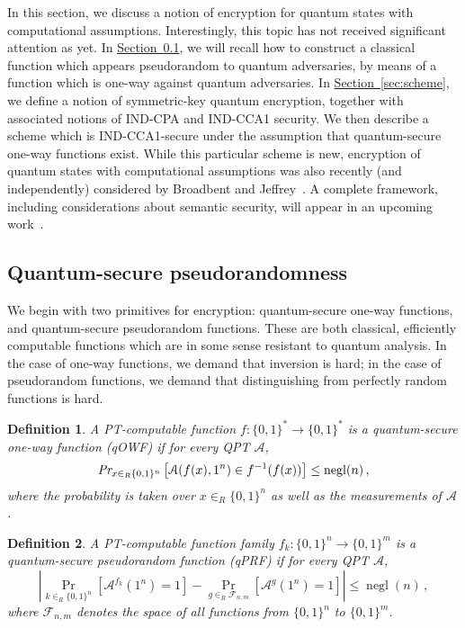 \documentclass[11pt]{article}
\numberwithin{equation}{section}
\newtheorem{definition}{Definition}
\newcommand{\opn}{\operatorname}
\newcommand{\expref}[2]{\texorpdfstring{\hyperref[#2]{#1~\ref{#2}}}{#1~\ref{#2}}}
\newcommand{\algo}{\mathcal}
\newcommand{\negl}{\opn{negl}}
\newcommand{\inrand}{\in_R}
\newcommand{\prob}{\opn{Pr}}
\begin{document}
{In this section, we discuss a notion of encryption for quantum states with computational assumptions.  Interestingly, this topic has not received significant attention as yet. In \expref{Section}{sec:pseudo}, we will recall how to construct a classical function which appears pseudorandom to quantum adversaries, by means of a function which is one-way against quantum adversaries. In \expref{Section}{sec:scheme}, we define a notion of symmetric-key quantum encryption, together with associated notions of IND-CPA and IND-CCA1 security. We then describe a scheme which is IND-CCA1-secure under the assumption that quantum-secure one-way functions exist. While this particular scheme is new, encryption of quantum states with computational assumptions was also recently (and independently) considered by Broadbent and Jeffrey~\cite{BJ15}. A complete framework, including considerations about semantic security, will appear in an upcoming work~\cite{ABFGSS15}.

\subsection{Quantum-secure pseudorandomness}\label{sec:pseudo}

We begin with two primitives for encryption: quantum-secure one-way functions, and quantum-secure pseudorandom functions. These are both classical, efficiently computable functions which are in some sense resistant to quantum analysis. In the case of one-way functions, we demand that inversion is hard; in the case of pseudorandom functions, we demand that distinguishing from perfectly random functions is hard.

\begin{definition}\label{def:quantum-secure-owf}
A PT-computable function $f:\{0,1\}^* \rightarrow \{0, 1\}^*$ is a quantum-secure one-way function (qOWF) if for every QPT $\algo A$, 
$$
\emph{Pr}_{x \inrand \{0, 1\}^n} \left[\algo A (f(x), 1^n) \in f^{-1}(f(x)) \right] \leq \negl(n)\,,
$$
where the probability is taken over $x \inrand \{0, 1\}^n$ as well as the measurements of $\algo A$.
\end{definition}

\begin{definition}\label{def:quantum-secure-prf}
A PT-computable function family $f_k : \{0,1\}^n \rightarrow \{0, 1\}^m$ is a quantum-secure pseudorandom function (qPRF) if for every QPT $\algo A$, 
$$
\left|\prob_{k \inrand \{0, 1\}^n} [\algo A^{f_k}(1^n) = 1] - \prob_{g \inrand \mathcal F_{n, m}}[ \algo A^g(1^n) = 1]\right|
\leq \negl(n)\,,
$$
where $\mathcal F_{n, m}$ denotes the space of all functions from $\{0,1\}^n$ to $\{0,1\}^m$.
\end{definition}

}
\end{document}
